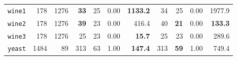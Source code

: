 \begin{tabular}{lccrrrrrrrr}
\texttt{wine1} & \multicolumn{1}{r}{178} & \multicolumn{1}{r}{1276}  & \textbf{33} & 25 & 0.00 & \textbf{1133.2} & 34 & 25 & 0.00 & 1977.9\\
\texttt{wine2} & \multicolumn{1}{r}{178} & \multicolumn{1}{r}{1276}  & \textbf{39} & 23 & 0.00 & 416.4 & 40 & \textbf{21} & 0.00 & \textbf{133.3}\\
\texttt{wine3} & \multicolumn{1}{r}{178} & \multicolumn{1}{r}{1276}  & 25 & 23 & 0.00 & \textbf{15.7} & 25 & 23 & 0.00 & 289.6\\
\texttt{yeast} & \multicolumn{1}{r}{1484} & \multicolumn{1}{r}{89}  & 313 & 63 & 1.00 & \textbf{147.4} & 313 & \textbf{59} & 1.00 & 749.4\\
\bottomrule
\end{tabular}
